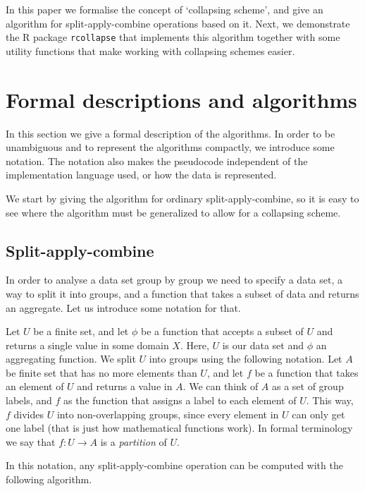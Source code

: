 \documentclass[11pt, fleqn]{article}
\begin{document}
In this paper we formalise the concept of `collapsing scheme', and give an
algorithm for split-apply-combine operations based on it. Next, we demonstrate
the R package \texttt{rcollapse} that implements this algorithm together with
some utility functions that make working with collapsing schemes easier.



\section{Formal descriptions and algorithms}
In this section we give a formal description of the algorithms. In order to be
unambiguous and to represent the algorithms compactly, we introduce some
notation. The notation also makes the pseudocode independent of the
implementation language used, or how the data is represented. 

We start by giving the algorithm for ordinary split-apply-combine, so it is
easy to see where the algorithm must be generalized to allow for a collapsing
scheme.


\subsection{Split-apply-combine}
In order to analyse a data set group by group we need to specify a data set, a
way to split it into groups, and a function that takes a subset of data and
returns an aggregate. Let us introduce some notation for that.

Let $U$ be a finite set, and let $\phi$ be a function that accepts a subset of
$U$ and returns a single value in some domain $X$. Here, $U$ is our data set
and $\phi$ an aggregating function. We split $U$ into groups using the
following notation. Let $A$ be finite set that has no more elements than $U$,
and let $f$ be a function that takes an element of $U$ and returns a value in
$A$. We can think of $A$ as a set of group labels, and $f$ as the function that
assigns a label to each element of $U$. This way, $f$ divides $U$ into
non-overlapping groups, since every element in $U$ can only get one label (that
is just how mathematical functions work). In formal terminology we say that
$f:U\to A$ is a \emph{partition} of $U$.

In this notation, any split-apply-combine operation can be computed with the following
algorithm.
\end{document}
